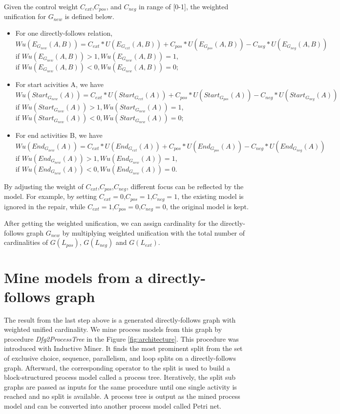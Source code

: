 \begin{definition}
	Given the control weight $C_{ext}$,$C_{pos}$, and $C_{neg}$ in range of [0-1], the weighted unification for $G_{new}$ is defined below.
	\begin{itemize}
		\item For one directly-follows relation, \[ Wu(E_{G_{new}}(A,B)) = C_{ext}*U(E_{G_{ext}}(A,B))+ C_{pos}*U(E_{G_{pos}}(A,B))  - C_{neg}*U(E_{G_{neg}}(A,B))\]
		if $Wu(E_{G_{new}}(A,B)) > 1 , Wu(E_{G_{new}}(A,B)) =1$, \\
		if $Wu(E_{G_{new}}(A,B)) < 0 , Wu(E_{G_{new}}(A,B)) =0$; 
		
		\item For start acivities A, we have 
		\[ Wu(Start_{G_{new}}(A)) = C_{ext}*U(Start_{G_{ext}}(A))+ C_{pos}*U(Start_{G_{pos}}(A)) - C_{neg}*U(Start_{G_{neg}}(A)) \]
		if $Wu(Start_{G_{new}}(A)) > 1 , Wu(Start_{G_{new}}(A)) =1$, \\
		if $Wu(Start_{G_{new}}(A)) < 0 , Wu(Start_{G_{new}}(A)) =0$;  
		
		\item For end activities B, we have
		\[ Wu(End_{G_{new}}(A)) =  C_{ext}*U(End_{G_{ext}}(A)) + C_{pos}*U(End_{G_{pos}}(A))  - C_{neg}*U(End_{G_{neg}}(A)) \]
		if $Wu(End_{G_{new}}(A)) > 1 , Wu(End_{G_{new}}(A)) =1$, \\
		if $Wu(End_{G_{new}}(A)) < 0 , Wu(End_{G_{new}}(A)) =0$. 
	\end{itemize}
\end{definition}
By adjusting the weight of $C_{ext}$,$C_{pos}$,$C_{neg}$, different focus can be reflected by the model. For example, by setting $C_{ext}=0$,$C_{pos}=1$,$C_{neg}=1$, the existing model is ignored in the repair, while  $C_{ext}=1$,$C_{pos}=0$,$C_{neg}=0$, the original model is kept.

After getting the weighted unification, we can assign cardinality for the directly-follows graph $G_{new}$ by multiplying weighted unification with the total number of cardinalities of $G(L_{pos})$, $G(L_{neg})$ and $G(L_{ext})$. 
\section{Mine models from a directly-follows graph}
The result from the last step above is a generated directly-follows graph with weighted unified cardinality. We mine process models from this graph by procedure \emph{Dfg2ProcessTree} in the Figure \ref{fig:architecture}. This procedure was introduced with Inductive Miner\cite{leemans2013discovering}. It finds the most prominent split from the set of exclusive choice, sequence, parallelism, and loop splits on  a directly-follows graph.  Afterward, the corresponding operator to the split is used to build a block-structured process model called a process tree. Iteratively, the split sub graphs are passed as inputs for the same procedure until one single activity is reached and no split is available. A process tree is output as the mined process model and can be converted into another process model called Petri net.

